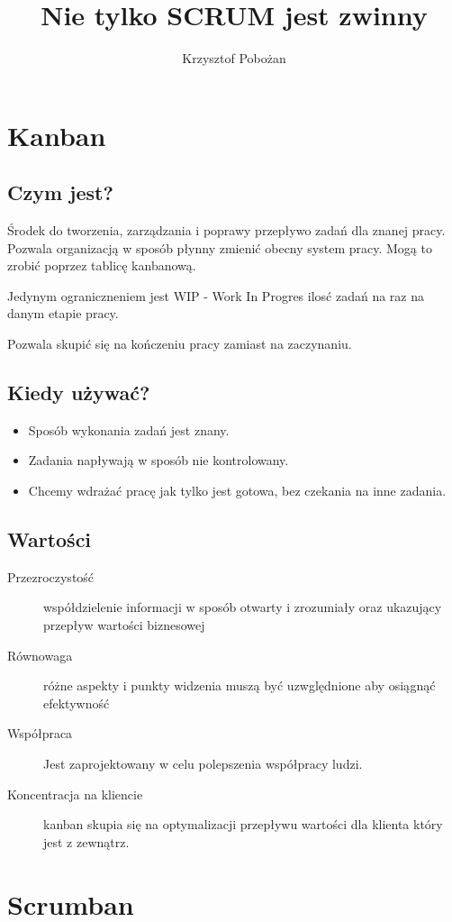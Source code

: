\documentclass[epic,eepic,aspectratio=169,12pt]{article}
\title{Nie tylko SCRUM jest zwinny}
\author{Krzysztof Pobożan}
\begin{document}
	\maketitle
		\tableofcontents

\section{Kanban}
\subsection{Czym jest?}
	Środek do tworzenia, zarządzania i poprawy przepływo zadań dla znanej pracy.
	Pozwala organizacją w sposób płynny zmienić obecny system pracy.
	Mogą to zrobić poprzez tablicę kanbanową.
	
	Jedynym ograniczneniem jest WIP - Work In Progres ilosć zadań na raz na danym etapie pracy.
	
	Pozwala skupić się na kończeniu pracy zamiast na zaczynaniu.
\subsection{Kiedy używać?}
	\begin{itemize}
		\item Sposób wykonania zadań jest znany.
		\item Zadania napływają w sposób nie kontrolowany.
		\item Chcemy wdrażać pracę jak tylko jest gotowa, bez czekania na inne zadania.
	\end{itemize}
\subsection{Wartości}
\begin{description}
	\item[Przezroczystość] współdzielenie informacji w sposób otwarty i zrozumiały oraz ukazujący przepływ wartości biznesowej
	\item[Równowaga] różne aspekty i punkty widzenia muszą być uzwględnione aby osiągnąć efektywność
	\item[Współpraca] Jest zaprojektowany w celu polepszenia współpracy ludzi.
	\item[Koncentracja na kliencie] kanban skupia się na optymalizacji przepływu wartości dla klienta który jest z zewnątrz.

\end{description}

\section{Scrumban}
\end{document}
